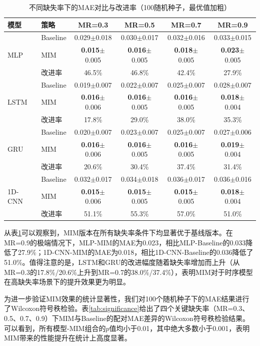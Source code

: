 \documentclass[10pt,a4paper]{ctexart}
\begin{document}
\begin{table}[H]
\centering
\small
\caption{不同缺失率下的MAE对比与改进率（100随机种子，最优值加粗）}
\label{tab:full_results}
\begin{tabular}{@{}llcccc@{}}
\toprule
\textbf{模型} & \textbf{策略} & \textbf{MR=0.3} & \textbf{MR=0.5} & \textbf{MR=0.7} & \textbf{MR=0.9} \\
\midrule
\multirow{3}{*}{MLP} 
& Baseline & 0.029$\pm$0.018 & 0.030$\pm$0.017 & 0.032$\pm$0.016 & 0.033$\pm$0.015 \\
& MIM & \textbf{0.015}$\pm$0.005 & \textbf{0.016}$\pm$0.005 & \textbf{0.018}$\pm$0.005 & \textbf{0.023}$\pm$0.005 \\
& 改进率 & 46.5\% & 46.8\% & 42.4\% & 27.9\% \\
\midrule
\multirow{3}{*}{LSTM} 
& Baseline & 0.019$\pm$0.007 & 0.022$\pm$0.007 & 0.025$\pm$0.007 & 0.028$\pm$0.007 \\
& MIM & \textbf{0.016}$\pm$0.006 & \textbf{0.016}$\pm$0.005 & \textbf{0.016}$\pm$0.005 & \textbf{0.018}$\pm$0.004 \\
& 改进率 & 17.8\% & 29.0\% & 38.0\% & 35.3\% \\
\midrule
\multirow{3}{*}{GRU} 
& Baseline & 0.020$\pm$0.007 & 0.023$\pm$0.007 & 0.025$\pm$0.007 & 0.027$\pm$0.006 \\
& MIM & \textbf{0.016}$\pm$0.006 & \textbf{0.016}$\pm$0.005 & \textbf{0.016}$\pm$0.005 & \textbf{0.019}$\pm$0.004 \\
& 改进率 & 20.6\% & 30.4\% & 37.4\% & 31.4\% \\
\midrule
\multirow{3}{*}{1D-CNN} 
& Baseline & 0.032$\pm$0.017 & 0.034$\pm$0.018 & 0.036$\pm$0.017 & 0.036$\pm$0.016 \\
& MIM & \textbf{0.015}$\pm$0.006 & \textbf{0.015}$\pm$0.005 & \textbf{0.015}$\pm$0.005 & \textbf{0.018}$\pm$0.004 \\
& 改进率 & 51.1\% & 55.3\% & 57.0\% & 51.0\% \\
\bottomrule
\end{tabular}
\end{table}

从表\ref{tab:full_results}可以观察到，MIM版本在所有缺失率条件下均显著优于基线版本。在MR=0.9的极端情况下，MLP-MIM的MAE为0.023，相比MLP-Baseline的0.033降低了27.9\%；1D-CNN-MIM的MAE为0.018，相比1D-CNN-Baseline的0.036降低了51.0\%。值得注意的是，LSTM和GRU的改进幅度随着缺失率增加而上升（从MR=0.3的17.8\%/20.6\%上升到MR=0.7的38.0\%/37.4\%），表明MIM对于时序模型在高缺失率场景下的提升效果更为明显。

为进一步验证MIM效果的统计显著性，我们对100个随机种子下的MAE结果进行了Wilcoxon符号秩检验。表\ref{tab:significance}给出了四个关键缺失率（MR=0.3、0.5、0.7、0.9）下MIM与Baseline的配对MAE差异的Wilcoxon符号秩检验结果。可以看到，所有模型-MIM组合的$p$值均小于0.01，其中绝大多数小于0.001，表明MIM带来的性能提升在统计上高度显著。
\end{document}
